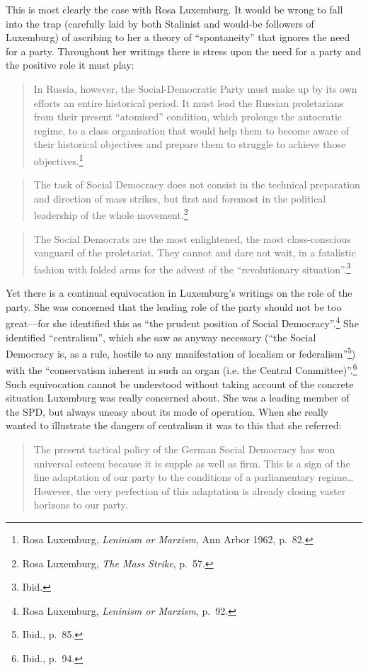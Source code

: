 This is most clearly the case with Rosa Luxemburg. It would be wrong to fall into the trap (carefully laid by both Stalinist and would-be followers of Luxemburg) of ascribing to her a theory of ``spontaneity'' that ignores the need for a party. Throughout her writings there is stress upon the need for a party and the positive role it must play:

\blockquote{In Russia, however, the Social-Democratic Party must make up by its own efforts an entire historical period. It must lead the Russian proletarians from their present ``atomised'' condition, which prolongs the autocratic regime, to a class organisation that would help them to become aware of their historical objectives and prepare them to struggle to achieve those objectives.\footnote{Rosa Luxemburg, \emph{Leninism or Marxism}, Ann Arbor 1962, p.~82.}}

\blockquote{The task of Social Democracy does not consist in the technical preparation and direction of mass strikes, but first and foremost in the political leadership of the whole movement.\footnote{Rosa Luxemburg, \emph{The Mass Strike}, p.~57.}}

\blockquote{The Social Democrats are the most enlightened, the most class-conscious vanguard of the proletariat. They cannot and dare not wait, in a fatalistic fashion with folded arms for the advent of the ``revolutionary situation''.\footnote{Ibid.}}

Yet there is a continual equivocation in Luxemburg's writings on the role of the party. She was concerned that the leading role of the party should not be too great---for she identified this as ``the prudent position of Social Democracy''.\footnote{Rosa Luxemburg, \emph{Leninism or Marxism}, p.~92.} She identified ``centralism'', which she saw as anyway necessary (``the Social Democracy is, as a rule, hostile to any manifestation of localism or federalism''\footnote{Ibid., p.~85.}) with the ``conservatism inherent in such an organ (i.e. the Central Committee)''.\footnote{Ibid., p.~94.} Such equivocation cannot be understood without taking account of the concrete situation Luxemburg was really concerned about. She was a leading member of the SPD, but always uneasy about its mode of operation. When she really wanted to illustrate the dangers of centralism it was to this that she referred:

\blockquote{The present tactical policy of the German Social Democracy has won universal esteem because it is supple as well as firm. This is a sign of the fine adaptation of our party to the conditions of a parliamentary regime\ldots However, the very perfection of this adaptation is already closing vaster horizons to our party.}

